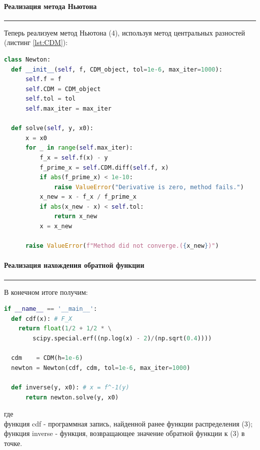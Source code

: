 \documentclass[a4paper, 14pt]{extarticle}
\begin{document}
\paragraph{Реализация метода Ньютона}\vspace{-20pt}\rule{\linewidth}{0.1mm}

Теперь реализуем метод Ньютона (4), используя метод центральных разностей 
(листинг \ref{lst:CDM}):

\begin{lstlisting}[language=Python, 
  caption={Реализация метода Ньютона}, 
  label={lst:Newton}]
class Newton:
  def __init__(self, f, CDM_object, tol=1e-6, max_iter=1000):
      self.f = f
      self.CDM = CDM_object
      self.tol = tol 
      self.max_iter = max_iter

  def solve(self, y, x0):
      x = x0
      for _ in range(self.max_iter):
          f_x = self.f(x) - y
          f_prime_x = self.CDM.diff(self.f, x)
          if abs(f_prime_x) < 1e-10:
              raise ValueError("Derivative is zero, method fails.")
          x_new = x - f_x / f_prime_x
          if abs(x_new - x) < self.tol:
              return x_new
          x = x_new

      raise ValueError(f"Method did not converge.({x_new})")
\end{lstlisting}

\paragraph{Реализация нахождения обратной функции}\vspace{-20pt}\rule{\linewidth}{0.1mm}

В конечном итоге получим:\\

\begin{lstlisting}[language=Python, 
                   caption={Реализация нахождения обратной функции}, 
                   label={lst:inverse}]
if __name__ == '__main__':
  def cdf(x): # F_X
    return float(1/2 + 1/2 * \
        scipy.special.erf((np.log(x) - 2)/(np.sqrt(0.4))))

  cdm    = CDM(h=1e-6)
  newton = Newton(cdf, cdm, tol=1e-6, max_iter=1000)

  def inverse(y, x0): # x = f^-1(y)
      return newton.solve(y, x0)
\end{lstlisting}
\vspace{10pt}
где\\ 
функция cdf - программная запись, найденной ранее функции распределения (3);\\
функция inverse - функция, возвращающее значение обратной функции к (3) в точке.\\
\end{document}
